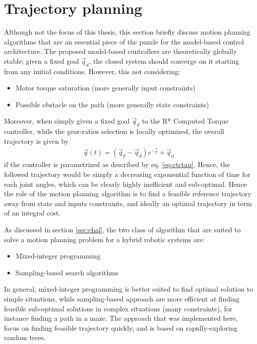 \section{Trajectory planning}
\label{sec:SamplingBasedTrajectoryPlanner}

Although not the focus of this thesis, this section briefly discuss motion planning algorithms that are an essential piece of the puzzle for the model-based control architecture. The proposed model-based controllers are theoretically globally stable; given a fixed goal $\vec{q}_d$, the closed system should converge on it starting from any initial conditions. However, this not considering:
%
\begin{itemize}
	\item Motor torque saturation (more generally input constraints)
	\item Possible obstacle on the path (more generally state constraints)
\end{itemize}
%
Moreover, when simply given a fixed goal $\vec{q}_d$ to the R* Computed Torque controller, while the gear-ratios selection is locally optimized, the overall trajectory is given by 
%
\begin{align}
\vec{q}(t)   = (\vec{q}_0 - \vec{q}_d)  e^{-\frac{t}{\tau}} + \vec{q}_d
\end{align}
%
if the controller is parametrized as described by eq. \eqref{eq:ctctau}. Hence, the followed trajectory would be simply a decreasing exponential function of time for each joint angles, which can be clearly highly inefficient and sub-optimal. Hence the role of the motion planning algorithm is to find a feasible reference trajectory away from state and inputs constraints, and ideally an optimal trajectory in term of an integral cost. 

As discussed in section \ref{sec:chal}, the two class of algorithm that are suited to solve a motion planning problem for a hybrid robotic systems are:
%
\begin{itemize}
	\item Mixed-integer programming
	\item Sampling-based search algorithms
\end{itemize}
%
In general, mixed-integer programming is better suited to find optimal solution to simple situations, while sampling-based approach are more efficient at finding feasible sub-optimal solutions in complex situations (many constraints), for instance finding a path in a maze. The approach that was implemented here, focus on finding feasible trajectory quickly, and is based on rapidly-exploring random trees.

